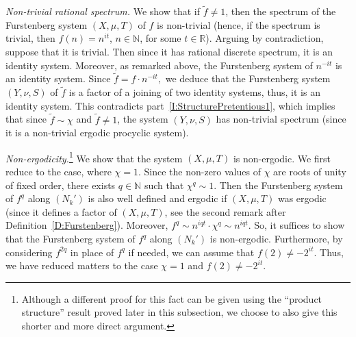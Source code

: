 \documentclass[11pt]{amsart}
\theoremstyle{definition}
\newcommand{\N}{{\mathbb N}}
\newcommand{\R}{{\mathbb R}}
\begin{document}
{\em Non-trivial rational spectrum.} We show that if $\tilde{f}\neq 1$, then  the spectrum of the Furstenberg system $(X,\mu,T)$ of
 $f$ is non-trivial (hence,  if the spectrum is trivial, then $f(n)=n^{it}$, $n\in\N$, for some $t\in \R$). Arguing by contradiction, suppose that it is trivial. Then since it has rational discrete spectrum, it is an identity system.
  Moreover,  as remarked above, the Furstenberg system    of $n^{-it}$ is an identity system.
 Since $\tilde{f}=f\cdot n^{-it},$ we  deduce that the
 Furstenberg system $(Y,\nu,S)$ of $\tilde{f}$  is a factor of a joining  of two identity systems,  thus, it  is an identity system. This contradicts  part~\eqref{I:StructurePretentious1}, which implies that since $\tilde{f}\sim \chi$ and $\tilde{f}\neq 1$, the system $(Y,\nu,S)$  has non-trivial spectrum (since it is a non-trivial ergodic procyclic system).


 \smallskip



 {\em Non-ergodicity.}\footnote{Although a different proof for this fact can be given using the ``product structure'' result proved later in this subsection,  we  choose to also give this shorter and more direct argument.} We show that the system $(X,\mu,T)$ is non-ergodic.
 We first reduce to the case, where $\chi=1$. Since the non-zero values of $\chi$ are roots of unity of fixed order, there exists $q\in \N$ such that  $\chi^q\sim 1$. Then the  Furstenberg system of $f^q$ along $(N_k')$ is also well defined and ergodic  if $(X,\mu,T)$ was ergodic (since it defines
 a factor of $(X,\mu,T)$, see the second remark after Definition~\ref{D:Furstenberg}). Moreover,  $f^q\sim n^{iqt}\cdot \chi^q\sim n^{iqt}$. So, it suffices to show that
 the Furstenberg system of $f^q$ along $(N_k')$ is non-ergodic. Furthermore, by considering $f^{2q}$ in place of $f^q$ if needed, we can assume that  $f(2)\neq -2^{it}$. Thus, we have reduced matters to the case $\chi=1$ and $f(2)\neq -2^{it}$.
\end{document}
